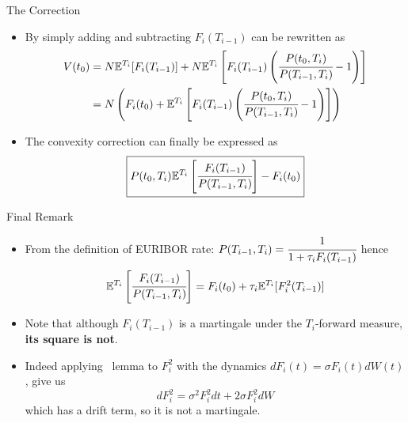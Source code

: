 \documentclass{beamer}
\begin{document}
\begin{frame}{The Correction}
\begin{itemize}
\item<1-> By simply adding and subtracting $F_i(T_{i-1})$ can be rewritten as 
\begin{equation*}
\begin{aligned}
V(t_0) &= N \mathbb{E}^{T_i}[F_i(T_{i-1})] + N \mathbb{E}^{T_i}\left[F_i(T_{i-1})\left(\cfrac{P(t_0,T_i)}{P(T_{i-1}, T_i)}-1\right)\right]\\
&=N\left(F_i(t_0) + \mathbb{E}^{T_i}\left[F_i(T_{i-1})\left(\cfrac{P(t_0,T_i)}{P(T_{i-1}, T_i)}-1\right)\right]\right)
\end{aligned}
\end{equation*}
\item<2-> The convexity correction can finally be expressed as
\begin{equation}
\boxed{	
P(t_0,T_i)\mathbb{E}^{T_i}\left[\cfrac{F_i(T_{i-1})}{P(T_{i-1},T_i)}\right]-F_i(t_0)}
\end{equation}
\end{itemize}
\end{frame}

\begin{frame}{Final Remark}
\begin{itemize}
\item<1-> From the definition of EURIBOR rate: $P(T_{i-1},T_i)=\cfrac{1}{1+\tau_i F_i(T_{i-1})}$ hence
\begin{equation*}
\mathbb{E}^{T_i}\left[\cfrac{F_i(T_{i-1})}{P(T_{i-1},T_i)}\right]=F_i(t_0)+\tau_i\mathbb{E}^{T_i}[F_i^2(T_{i-1})]
\end{equation*}
\item<2-> Note that although $F_i(T_{i-1})$ is a martingale under the $T_i$-forward measure, \textbf{its square is not}.
\item<3-> Indeed applying \ito~lemma to $F_i^2$ with the  dynamics $dF_i(t) = \sigma F_i(t)dW(t)$, give us
\begin{equation*}
dF_i^2=\sigma^2F_i^2dt+2\sigma F_i^2dW
\end{equation*}
which has a drift term, so it is not a martingale.
\end{itemize}
\end{frame}
\end{document}
